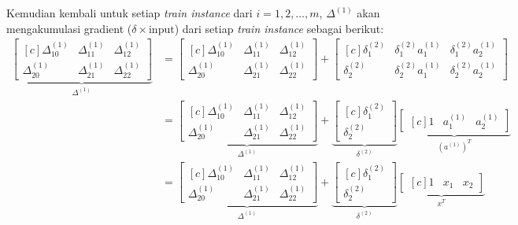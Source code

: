 \documentclass[12pt]{article}
\begin{document}
Kemudian kembali untuk setiap \textit{train instance} dari $i = 1, 2, \ldots, m$, $\Delta^{(1)}$ akan mengakumulasi gradient ($\delta \times \text{input}$) dari setiap \textit{train instance}  sebagai berikut:
\begin{align}
\underbrace{\begin{bmatrix}[c]
		\Delta_{10}^{(1)} & \Delta_{11}^{(1)} & \Delta_{12}^{(1)} \\
		\Delta_{20}^{(1)} & \Delta_{21}^{(1)} & \Delta_{22}^{(1)}		
	\end{bmatrix}}_{\Delta^{(1)}} &= \begin{bmatrix}[c]
		\Delta_{10}^{(1)} & \Delta_{11}^{(1)} & \Delta_{12}^{(1)} \\
		\Delta_{20}^{(1)} & \Delta_{21}^{(1)} & \Delta_{22}^{(1)}		
	\end{bmatrix} + \begin{bmatrix}[c]
		\delta_1^{(2)} & \delta_1^{(2)} a_1^{(1)} & \delta_1^{(2)} a_2^{(1)} \\
		\delta_2^{(2)} & \delta_2^{(2)} a_1^{(1)} & \delta_2^{(2)} a_2^{(1)}
	\end{bmatrix}	\\
	              &= \underbrace{\begin{bmatrix}[c]
		\Delta_{10}^{(1)} & \Delta_{11}^{(1)} & \Delta_{12}^{(1)} \\
		\Delta_{20}^{(1)} & \Delta_{21}^{(1)} & \Delta_{22}^{(1)}		
	\end{bmatrix}}_{\Delta^{(1)}} + \underbrace{\begin{bmatrix}[c]
		\delta_1^{(2)} \\
		\delta_2^{(2)}
	\end{bmatrix}}_{\delta^{(2)}}  \underbrace{\begin{bmatrix}[c]
		1 & a_1^{(1)} & a_2^{(1)}
	\end{bmatrix}}_{(a^{(1)})^T} \\
	              &= \underbrace{\begin{bmatrix}[c]
		\Delta_{10}^{(1)} & \Delta_{11}^{(1)} & \Delta_{12}^{(1)} \\
		\Delta_{20}^{(1)} & \Delta_{21}^{(1)} & \Delta_{22}^{(1)}		
	\end{bmatrix}}_{\Delta^{(1)}} + \underbrace{\begin{bmatrix}[c]
		\delta_1^{(2)} \\
		\delta_2^{(2)}
	\end{bmatrix}}_{\delta^{(2)}}  \underbrace{\begin{bmatrix}[c]
		1 & x_1 & x_2
	\end{bmatrix}}_{x^T}	 
\end{align}
\end{document}
